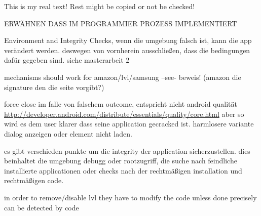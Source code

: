 This is my real text! Rest might be copied or not be checked!

ERWÄHNEN DASS IM PROGRAMMIER PROZESS  IMPLEMENTIERT\newline

Environment and Integrity Checks, wenn die umgebung falsch ist, kann die app verändert werden. deswegen von vornherein ausschließen, dass die bedingungen dafür gegeben sind.\newline
siehe masterarbeit 2\newline

mechanisms should work for amazon/lvl/samsung --see- beweis! (amazon die signature den die seite vorgibt?)\newline

force close im falle von falschem outcome, entspricht nicht android qualität
\url{http://developer.android.com/distribute/essentials/quality/core.html} aber so wird es dem user klarer dass seine application gecracked ist. harmlosere variante dialog anzeigen oder element nicht laden.

es gibt verschieden punkte um die integrity der application sicherzustellen. dies beinhaltet die umgebung debugg oder rootzugriff, die suche nach feindliche installierte applicationen oder checks nach der rechtmäßigen installation und rechtmäßigen code.\newline

%
in order to remove/disable lvl they have to modify the code
unless done precisely can be detected by code 
\cite{developersSecuring}
%
